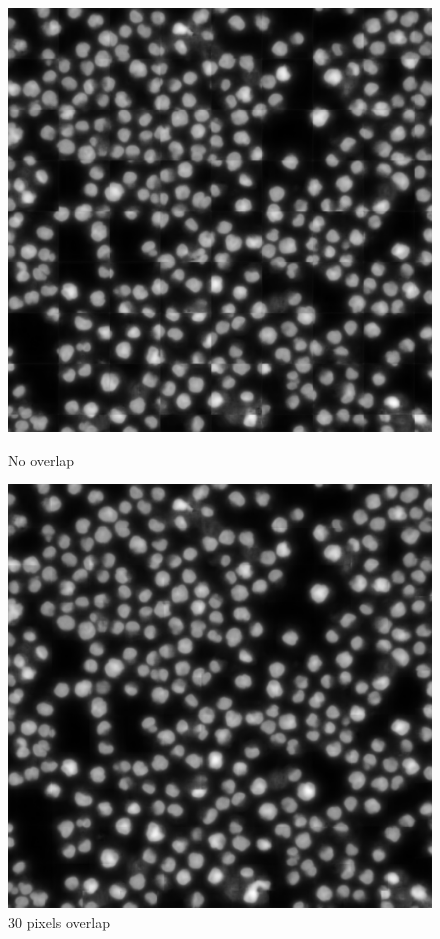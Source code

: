 \begin{figure}[H]
    \centering
    \begin{minipage}{.48\textwidth}
      \centering
      \includegraphics[width=\linewidth]{bilder/crops_combination/prediction_border_0.png}
      \caption{No overlap}
      \label{fig:crops_combination_0}
    \end{minipage}%
    \vspace{1cm}
    \begin{minipage}{.48\textwidth}
      \centering
      \includegraphics[width=\linewidth]{bilder/crops_combination/prediction_border_34.png}
      \caption{30 pixels overlap}
      \label{fig:crops_combination_34}
    \end{minipage}
\end{figure}

